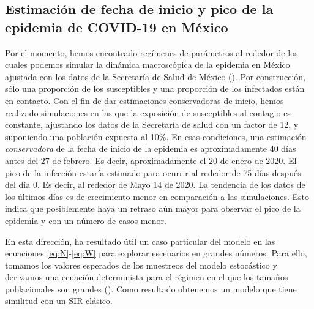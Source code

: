 \documentclass[8pt]{article}
\begin{document}
\subsection*{Estimación de fecha de inicio y pico de la epidemia de COVID-19 en México}


 Por el momento, hemos encontrado regímenes de parámetros al rededor de los cuales podemos simular la dinámica macroscópica de la epidemia en México ajustada con los datos de la Secretaría de Salud de México (). Por construcción, sólo una proporción de los susceptibles y una proporción de los infectados están en contacto. Con el fin de dar estimaciones conservadoras de inicio, hemos realizado simulaciones en las que la exposición de susceptibles al contagio es constante, ajustando los datos de la Secretaría de salud  con un factor de 12, y  suponiendo una  población expuesta al 10\%. En esas condiciones, una estimación \textit{conservadora} de la fecha de inicio de la epidemia es aproximadamente 40 días antes del 27 de febrero. Es decir, aproximadamente el 20 de enero de 2020. El pico de la infección estaría estimado para ocurrir al rededor de 75 días después del día 0. Es decir, al rededor de Mayo 14 de 2020. La tendencia de los datos de los últimos días es de crecimiento menor en comparación a las simulaciones. Esto indica que posiblemente haya un retraso aún mayor para observar el pico de la epidemia y con un número de casos menor.
 

En esta dirección, ha resultado útil un caso particular del modelo en las ecuaciones \eqref{eq:N}-\eqref{eq:W}  para explorar escenarios en grandes números.
 Para ello, tomamos los valores esperados de los muestreos del modelo estocástico y derivamos una ecuación determinista para el régimen en el que los tamaños poblacionales son grandes (). Como resultado obtenemos un modelo que tiene similitud con un SIR clásico.
\end{document}
